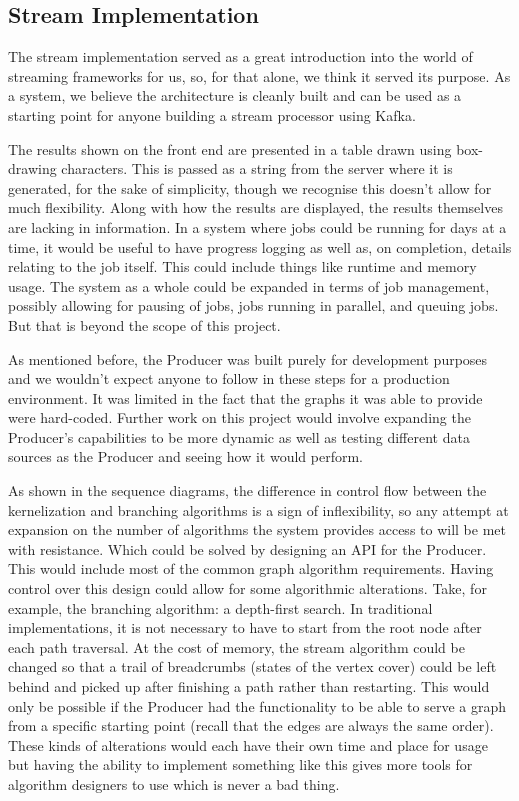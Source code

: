 \subsection{Stream Implementation}

The stream implementation served as a great introduction into the world of
streaming frameworks for us, so, for that alone, we think it served its
purpose. As a system, we believe the architecture is cleanly built and can be
used as a starting point for anyone building a stream processor using Kafka.

The results shown on the front end are presented in a table drawn using
box-drawing characters. This is passed as a string from the server where it is
generated, for the sake of simplicity, though we recognise this doesn't allow
for much flexibility. Along with how the results are displayed, the results
themselves are lacking in information. In a system where jobs could be running
for days at a time, it would be useful to have progress logging as well as, on
completion, details relating to the job itself. This could include things like
runtime and memory usage. The system as a whole could be expanded in terms of
job management, possibly allowing for pausing of jobs, jobs running in
parallel, and queuing jobs. But that is beyond the scope of this project.

As mentioned before, the Producer was built purely for development purposes and
we wouldn't expect anyone to follow in these steps for a production
environment. It was limited in the fact that the graphs it was able to provide
were hard-coded. Further work on this project would involve expanding the
Producer's capabilities to be more dynamic as well as testing different data
sources as the Producer and seeing how it would perform.

As shown in the sequence diagrams, the difference in control flow between the
kernelization and branching algorithms is a sign of inflexibility, so any
attempt at expansion on the number of algorithms the system provides access to
will be met with resistance. Which could be solved by designing an API for the
Producer. This would include most of the common graph algorithm requirements.
Having control over this design could allow for some algorithmic alterations.
Take, for example, the branching algorithm: a depth-first search. In
traditional implementations, it is not necessary to have to start from the root
node after each path traversal. At the cost of memory, the stream algorithm
could be changed so that a trail of breadcrumbs (states of the vertex cover)
could be left behind and picked up after finishing a path rather than
restarting. This would only be possible if the Producer had the functionality
to be able to serve a graph from a specific starting point (recall that the
edges are always the same order). These kinds of alterations would each have
their own time and place for usage but having the ability to implement
something like this gives more tools for algorithm designers to use which is
never a bad thing.

